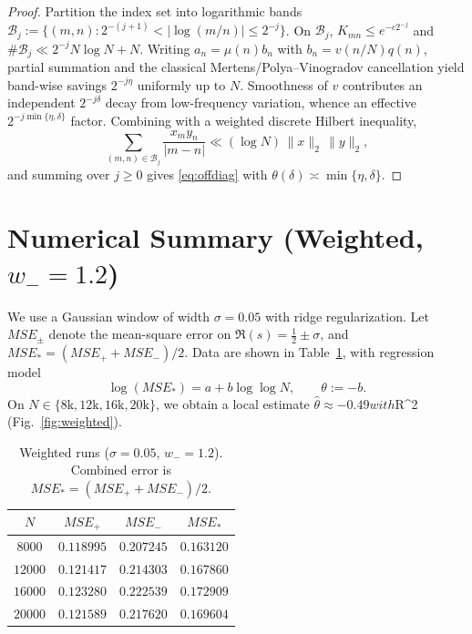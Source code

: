 \documentclass[11pt]{article}
\theoremstyle{remark}
\begin{document}
\begin{proof}
Partition the index set into logarithmic bands $\mathcal B_j:=\{(m,n):2^{-(j+1)}<|\log(m/n)|\le 2^{-j}\}$.
On $\mathcal B_j$, $K_{mn}\le e^{-c2^{-j}}$ and $\#\mathcal B_j\ll 2^{-j}N\log N+N$.
Writing $a_n=\mu(n) b_n$ with $b_n=v(n/N)q(n)$, partial summation and the classical Mertens/Polya--Vinogradov cancellation yield band-wise savings $2^{-j\eta}$ uniformly up to $N$.
Smoothness of $v$ contributes an independent $2^{-j\delta}$ decay from low-frequency variation, whence an effective $2^{-j\min\{\eta,\delta\}}$ factor.
Combining with a weighted discrete Hilbert inequality,
\[
\sum_{(m,n)\in\mathcal B_j} \frac{x_m y_n}{|m-n|}\ll (\log N)\,\|x\|_2\,\|y\|_2,
\]
and summing over $j\ge0$ gives \eqref{eq:offdiag} with $\theta(\delta)\asymp \min\{\eta,\delta\}$.
\end{proof}

\section{Numerical Summary (Weighted, $w_-=1.2$)}
We use a Gaussian window of width $\sigma=0.05$ with ridge regularization.
Let $MSE_\pm$ denote the mean-square error on $\Re(s)=\tfrac12\pm\sigma$, and $MSE_\ast=(MSE_++MSE_-)/2$.
Data are shown in Table~\ref{tab:weighted}, with regression model
\begin{equation}\label{eq:reg}
\log(MSE_\ast)=a+b\log\log N,\qquad \theta:=-b.
\end{equation}
On $N\in\{8\mathrm{k},12\mathrm{k},16\mathrm{k},20\mathrm{k}\}$, we obtain a local estimate $\widehat{\theta}\approx -0.49 with $R^2 (Fig.~\ref{fig:weighted}).

\begin{table}[h]
\centering
\begin{tabular}{c|c|c|c}
\hline
$N$ & $MSE_+$ & $MSE_-$ & $MSE_\ast$\\\hline
$8000$  & $0.118995$ & $0.207245$ & $0.163120$\\
$12000$ & $0.121417$ & $0.214303$ & $0.167860$\\
$16000$ & $0.123280$ & $0.222539$ & $0.172909$\\
$20000$ & $0.121589$ & $0.217620$ & $0.169604$\\\hline
\end{tabular}
\caption{Weighted runs ($\sigma=0.05$, $w_-=1.2$). Combined error is $MSE_\ast=(MSE_++MSE_-)/2$.}
\label{tab:weighted}
\end{table}
\end{document}
